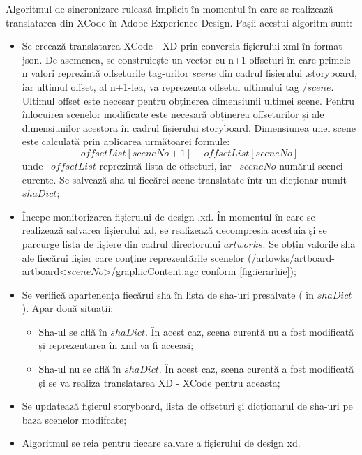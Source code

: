 Algoritmul de sincronizare rulează implicit în momentul în care se realizează translatarea din XCode în Adobe Experience Design. Pașii acestui algoritm sunt:

\begin{itemize}  
\item Se creează translatarea XCode - XD prin conversia fișierului xml în format json. De asemenea, se construiește un vector cu n+1 offseturi în care primele n valori reprezintă offseturile tag-urilor $scene$ din cadrul fișierului .storyboard, iar ultimul offset, al n+1-lea, va reprezenta offsetul ultimului tag $/scene$. Ultimul offset este necesar pentru obținerea dimensiunii ultimei scene. 
Pentru înlocuirea scenelor modificate este necesară obținerea offseturilor și ale dimensiunilor acestora în cadrul fișierului storyboard. Dimensiunea unei scene este calculată prin aplicarea următoarei formule:
\[offsetList[sceneNo + 1] - offsetList[sceneNo]\]
unde ~$offsetList$ reprezintă lista de offseturi, iar ~$sceneNo$ numărul scenei curente. Se salvează sha-ul fiecărei scene translatate într-un dicționar numit $shaDict$;

\item Începe monitorizarea fișierului de design .xd. În momentul în care se realizează salvarea fișierului xd, se realizează decompresia acestuia și se parcurge lista de fișiere din cadrul directorului $artworks$. Se obțin valorile sha ale fiecărui fișier care conține reprezentările scenelor (/artowks/artboard-artboard<$sceneNo$>/graphicContent.agc conform \ref{fig:ierarhie}); 
\item Se verifică apartenența fiecărui sha în lista de sha-uri presalvate ( în $shaDict$). Apar două situații:
    \begin{itemize}  
    \item Sha-ul se află în $shaDict$. În acest caz, scena curentă nu a fost modificată și reprezentarea în xml va fi aceeași;
    \item Sha-ul nu se află în $shaDict$. În acest caz, scena curentă a fost modificată și se va realiza translatarea XD - XCode pentru aceasta;
    \end{itemize}
\item Se updatează fișierul storyboard, lista de offseturi și dicționarul de sha-uri pe baza scenelor modifcate;
\item Algoritmul se reia pentru fiecare salvare a fișierului de design xd.
\end{itemize}




